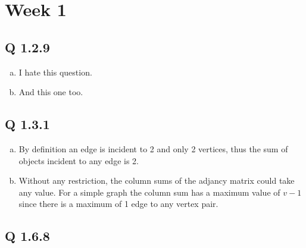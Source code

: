 

\chapter[Week 1]{Week 1}

\section{Q 1.2.9}

\begin{enumerate}[(a)]
\item I hate this question.
\item And this one too.
\end{enumerate}


\section{Q 1.3.1}

\begin{enumerate}[(a)]
\item By definition an edge is incident to 2 and only 2 vertices, thus the sum of objects incident to any edge is 2.

\item Without any restriction, the column sums of the adjancy matrix could take any value. For a simple graph the column sum has a maximum value of $v-1$ since there is a maximum of 1 edge to any vertex pair.
\end{enumerate}

\section{Q 1.6.8}

